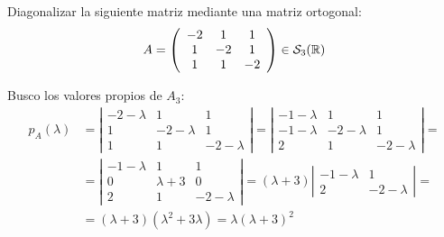 \begin{ejercicio}
    Diagonalizar la siguiente matriz mediante una matriz ortogonal:
    \begin{equation*}
        A= \left(
        \begin{array}{ccc}
            -2 & 1 & 1 \\
            1 & -2 & 1 \\
            1 & 1 & -2
        \end{array}
        \right)
        \in \mathcal{S}_3(\mathbb{R})
    \end{equation*}

    Busco los valores propios de $A_3$:
        \begin{equation*}\begin{split}
            p_{A}(\lambda)&
            =\left|\begin{array}{ccc}
                -2-\lambda & 1 & 1 \\
                1 & -2-\lambda & 1 \\
                1 & 1 & -2-\lambda
            \end{array}\right|
            =\left|\begin{array}{ccc}
                -1-\lambda & 1 & 1 \\
                -1-\lambda & -2-\lambda & 1 \\
                2 & 1 & -2-\lambda
            \end{array}\right|
            =\\&=\left|\begin{array}{ccc}
                -1-\lambda & 1 & 1 \\
                0 & \lambda + 3 & 0 \\
                2 & 1 & -2-\lambda
            \end{array}\right| = (\lambda+3) \left|\begin{array}{cc}
                -1-\lambda & 1 \\
                2 & -2-\lambda
            \end{array}\right| =\\&
            = (\lambda+3)(\lambda^2 +3\lambda) = \lambda(\lambda+3)^2
        \end{split}\end{equation*}


\end{ejercicio}
